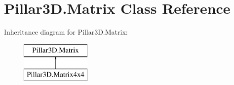 \hypertarget{class_pillar3_d_1_1_matrix}{}\section{Pillar3\+D.\+Matrix Class Reference}
\label{class_pillar3_d_1_1_matrix}
Inheritance diagram for Pillar3\+D.\+Matrix\+:\begin{figure}[H]
\begin{center}
\leavevmode
\includegraphics[height=2.000000cm]{class_pillar3_d_1_1_matrix}
\end{center}
\end{figure}
